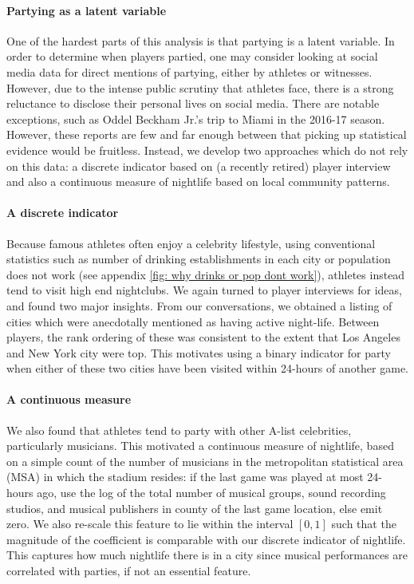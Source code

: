 \documentclass[letterpaper,12pt]{article}
\begin{document}
\paragraph{Partying as a latent variable}
One of the hardest parts of this analysis is that partying is a latent variable.
In order to determine when players partied, one may consider looking at social media data for direct mentions of partying, either by athletes or witnesses. However, due to the intense public scrutiny that athletes face, there is a strong reluctance to disclose their personal lives on social media. There are notable exceptions, such
as Oddel Beckham Jr.'s trip to Miami in the 2016-17 season.\citep{bieler, bleler}
However, these reports are few and far enough between that picking up statistical evidence would be fruitless.
Instead, we develop two approaches which do not rely on this data: a discrete indicator 
based on (a recently retired) player interview and also a continuous measure of nightlife based on local community patterns.

\paragraph{A discrete indicator}
Because famous athletes often enjoy a celebrity lifestyle, using conventional statistics
such as number of drinking establishments in each city or population does not work (see appendix \ref{fig: why drinks or pop dont work}), athletes instead
tend to visit high end nightclubs. We again turned to player interviews for ideas,
and found two major insights. From our conversations, 
we obtained a listing of cities which were anecdotally
mentioned as having active night-life. Between players, the rank ordering of these
was consistent to the extent that Los Angeles and New York city were top. 
This motivates using a binary indicator for party when either of these two cities have been visited within 24-hours of another game. 

\paragraph{A continuous measure}
We also found that athletes tend to party with other A-list celebrities,
particularly musicians. This motivated a continuous measure of nightlife, based on a simple count of the number of musicians in the metropolitan statistical area (MSA) 
in which the stadium resides: if the last game was played at most 24-hours ago, use the log of the total number
of musical groups, sound recording studios, and musical publishers in county of the 
last game location, else emit zero.  We also re-scale this feature to lie within the
interval $[0,1]$ such that the magnitude of the coefficient is comparable with our
discrete indicator of nightlife.
This captures how much nightlife there is in a city since musical performances are correlated
with parties, if not an essential feature.
\end{document}
